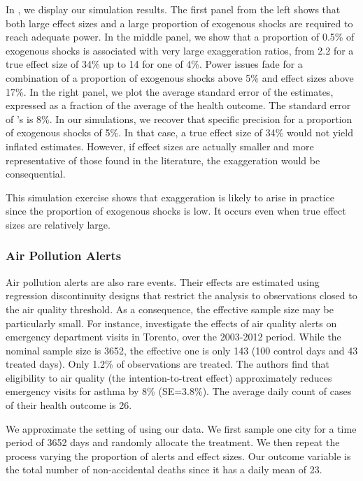 \documentclass[12pt]{article}
\begin{document}
            In , we display our simulation results. The first panel from the left shows that both large effect sizes and a large proportion of exogenous shocks are required to reach adequate power. In the middle panel, we show that a proportion of 0.5\% of exogenous shocks is associated with very large exaggeration ratios, from 2.2 for a true effect size of 34\% up to 14 for one of 4\%. Power issues fade for a combination of a proportion of exogenous shocks above 5\% and effect sizes above 17\%. In the right panel, we plot the average standard error of the estimates, expressed as a fraction of the average of the health outcome. The standard error of \cite{bauernschuster_when_2017}'s is 8\%. In our simulations, we recover that specific precision for a proportion of exogenous shocks of 5\%. In that case, a true effect size of 34\% would not yield inflated estimates. However, if effect sizes are actually smaller and more representative of those found in the literature, the exaggeration would be consequential.
            
            This simulation exercise shows that exaggeration is likely to arise in practice since the proportion of exogenous shocks is low. It occurs even when true effect sizes are relatively large.
        
        \subsubsection*{Air Pollution Alerts}
            
            Air pollution alerts are also rare events. Their effects are estimated using regression discontinuity designs that restrict the analysis to observations closed to the air quality threshold. As a consequence, the effective sample size may be particularly small. For instance, \cite{chen_effect_2018} investigate the effects of air quality alerts on emergency department visits in Torento, over the 2003-2012 period. While the nominal sample size is 3652, the effective one is only 143 (100 control days and 43 treated days). Only 1.2\% of observations are treated. The authors find that eligibility to air quality (the intention-to-treat effect) approximately reduces emergency visits for asthma by 8\% (SE=3.8\%). The average daily count of cases of their health outcome is 26.
        
            We approximate the setting of \cite{chen_effect_2018} using our data. We first sample one city for a time period of 3652 days and randomly allocate the treatment. We then repeat the process varying the proportion of alerts and effect sizes. Our outcome variable is the total number of non-accidental deaths since it has a daily mean of 23.
            
\end{document}
